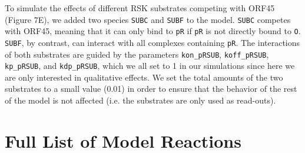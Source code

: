 \documentclass[12pt]{article}
\begin{document}
	To simulate the effects of different RSK substrates competing with ORF45 (Figure 7E), we added two species \texttt{SUBC} and \texttt{SUBF} to the model. \texttt{SUBC} competes with ORF45, meaning that it can only bind to \texttt{pR} if \texttt{pR} is not directly bound to \texttt{O}. \texttt{SUBF}, by contrast, can interact with all complexes containing \texttt{pR}. The interactions of both substrates are guided by the parameters \texttt{kon\_pRSUB}, \texttt{koff\_pRSUB}, \texttt{kp\_pRSUB}, and \texttt{kdp\_pRSUB}, which we all set to 1 in our simulations since here we are only interested in qualitative effects. We set the total amounts of the two substrates to a small value (0.01) in order to ensure that the behavior of the rest of the model is not affected (i.e. the substrates are only used as read-outs).
	
	\section{Full List of Model Reactions}
	\label{s:reactions}
\end{document}
